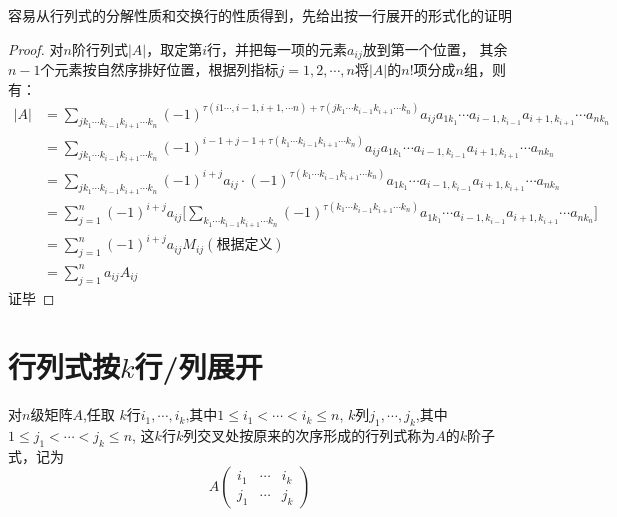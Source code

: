 容易从行列式的分解性质和交换行的性质得到，先给出按一行展开的形式化的证明
\begin{proof}
对$n$阶行列式$|A|$，取定第$i$行，并把每一项的元素$a_{ij}$放到第一个位置，
其余$n-1$个元素按自然序排好位置，根据列指标$j = 1, 2, \cdots, n$将$|A|$的$n!$项分成$n$组，则有：
\begin{equation*}
    \begin{split}
        |A| & = \sum_{j k_{1} \cdots k_{i-1} k_{i+1} \cdots k_{n}}^{} (-1)^{\tau (i 1 \cdots, i-1,i+1,\cdots n) + \tau(jk_{1} \cdots k_{i-1}k_{i+1} \cdots k_{n})} 
        a_{ij}a_{1k_{1}} \cdots a_{i-1,k_{i-1}} a_{i+1,k_{i+1}} \cdots a_{nk_{n}}\\
            & =  \sum_{j k_{1} \cdots k_{i-1} k_{i+1} \cdots k_{n}}^{} (-1)^{i-1 + j-1 + \tau(k_{1} \cdots k_{i-1}k_{i+1} \cdots k_{n})}
        a_{ij}a_{1k_{1}} \cdots a_{i-1,k_{i-1}} a_{i+1,k_{i+1}} \cdots a_{nk_{n}}\\
            & = \sum_{j k_{1} \cdots k_{i-1} k_{i+1} \cdots k_{n}}^{} (-1)^{i+j}a_{ij} \cdot (-1)^{\tau(k_{1} \cdots k_{i-1}k_{i+1} \cdots k_{n})}a_{1k_{1}} \cdots a_{i-1,k_{i-1}} a_{i+1,k_{i+1}} \cdots a_{nk_{n}}\\
            & = \sum_{j=1}^{n} (-1)^{i+j}a_{ij} \Biggl[ \sum_{k_{1} \cdots k_{i-1} k_{i+1} \cdots k_{n}}^{} (-1)^{\tau(k_{1} \cdots k_{i-1}k_{i+1} \cdots k_{n})}a_{1k_{1}} \cdots a_{i-1,k_{i-1}} a_{i+1,k_{i+1}} \cdots a_{nk_{n}} \Biggr]\\
            & = \sum_{j=1}^{n} (-1)^{i+j} a_{ij} M_{ij}(\text{根据定义})\\
            & = \sum_{j=1}^{n} a_{ij} A_{ij}
    \end{split}
\end{equation*}
    证毕
\end{proof}

\section{行列式按$k$行/列展开}
\begin{definition}[$k$阶子式]
    对$n$级矩阵$A$,任取
    $k$行$i_1,\cdots, i_k$,其中$1 \leq i_1 < \cdots < i_k \leq n$,
    $k$列$j_1,\cdots, j_k$,其中$1 \leq j_1 < \cdots < j_k \leq n$,
    这$k$行$k$列交叉处按原来的次序形成的行列式称为$A$的$k$阶子式，记为
    \begin{equation*}
        A
        \begin{pmatrix}
            i_1 & \cdots & i_k\\
            j_1 & \cdots & j_k
        \end{pmatrix}
    \end{equation*}
\end{definition}

